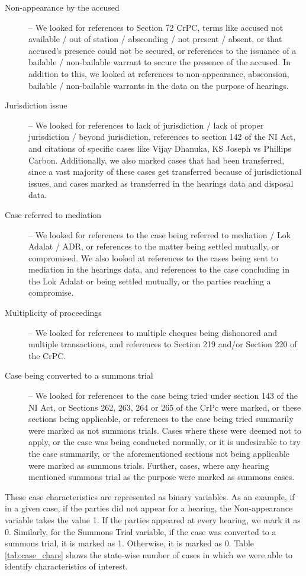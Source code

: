 \begin{description}
\item [Non-appearance by the accused] -- We looked for references to Section 72
  CrPC, terms like accused not available / out of station / absconding
  / not present / absent, or that accused’s presence could not be
  secured, or references to the issuance of a bailable / non-bailable
  warrant to secure the presence of the accused. In addition to this,
  we looked at references to non-appearance, absconsion, bailable /
  non-bailable warrants in the data on the purpose of hearings.
\item [Jurisdiction issue] -- We looked for references to lack of
  jurisdiction / lack of proper jurisdiction / beyond jurisdiction,
  references to section 142 of the NI Act, and citations of specific
  cases like Vijay Dhanuka, KS Joseph vs Phillips
  Carbon. Additionally, we also marked cases that had been
  transferred, since a vast majority of these cases get transferred
  because of jurisdictional issues, and cases marked as transferred in
  the hearings data and disposal data.
\item [Case referred to mediation] -- We looked for references to the case being
  referred to mediation / Lok Adalat / ADR, or references to the
  matter being settled mutually, or compromised. We also looked at
  references to the cases being sent to mediation in the hearings
  data, and references to the case concluding in the Lok Adalat or
  being settled mutually, or the parties reaching a compromise.
\item [Multiplicity of proceedings] -- We looked for references to multiple cheques being dishonored and multiple transactions, and references to Section 219 and/or Section 220 of the CrPC.
\item [Case being converted to a summons trial] -- We looked for references to the case being
  tried under section 143 of the NI Act, or Sections 262, 263, 264 or
  265 of the CrPc were marked, or these sections being applicable, or
  references to the case being tried summarily were marked as not
  summons trials. Cases where these were deemed not to apply, or
  the case was being conducted normally, or it is undesirable to try
  the case summarily, or the aforementioned sections not being
  applicable were marked as summons trials. Further, cases, where any hearing mentioned summons trial as the purpose were marked as summons cases.
\end{description}

These case characteristics are represented as
binary variables. As an example, if in a given case, if the parties
did not appear for a hearing, the Non-appearance variable takes the
value 1. If the parties appeared at every hearing, we mark it as
0. Similarly, for the Summons Trial variable, if the case was
converted to a summons trial, it is marked as 1. Otherwise, it is
marked as 0. Table \ref{tab:case_chars} shows the state-wise number of
cases in which we were able to identify characteristics of interest.

